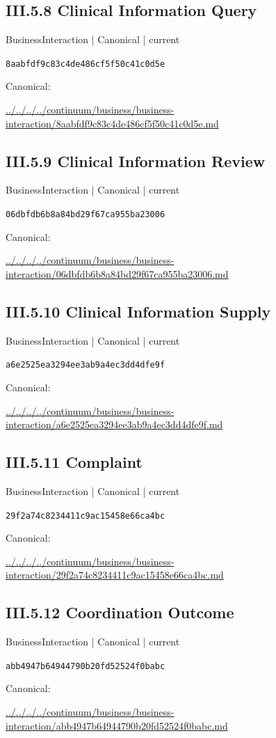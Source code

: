 \documentclass[10pt,a4paper]{article}
\begin{document}
\subsection*{III.5.8 Clinical Information Query}
{\small BusinessInteraction | Canonical | current}\par
\texttt{8aabfdf9c83c4de486cf5f50c41c0d5e}\par
Canonical: \par
{\footnotesize\url{../../../../continuum/business/business-interaction/8aabfdf9c83c4de486cf5f50c41c0d5e.md}}\par
\subsection*{III.5.9 Clinical Information Review}
{\small BusinessInteraction | Canonical | current}\par
\texttt{06dbfdb6b8a84bd29f67ca955ba23006}\par
Canonical: \par
{\footnotesize\url{../../../../continuum/business/business-interaction/06dbfdb6b8a84bd29f67ca955ba23006.md}}\par
\subsection*{III.5.10 Clinical Information Supply}
{\small BusinessInteraction | Canonical | current}\par
\texttt{a6e2525ea3294ee3ab9a4ec3dd4dfe9f}\par
Canonical: \par
{\footnotesize\url{../../../../continuum/business/business-interaction/a6e2525ea3294ee3ab9a4ec3dd4dfe9f.md}}\par
\subsection*{III.5.11 Complaint}
{\small BusinessInteraction | Canonical | current}\par
\texttt{29f2a74c8234411c9ac15458e66ca4bc}\par
Canonical: \par
{\footnotesize\url{../../../../continuum/business/business-interaction/29f2a74c8234411c9ac15458e66ca4bc.md}}\par
\subsection*{III.5.12 Coordination Outcome}
{\small BusinessInteraction | Canonical | current}\par
\texttt{abb4947b64944790b20fd52524f0babc}\par
Canonical: \par
{\footnotesize\url{../../../../continuum/business/business-interaction/abb4947b64944790b20fd52524f0babc.md}}\par
\end{document}
